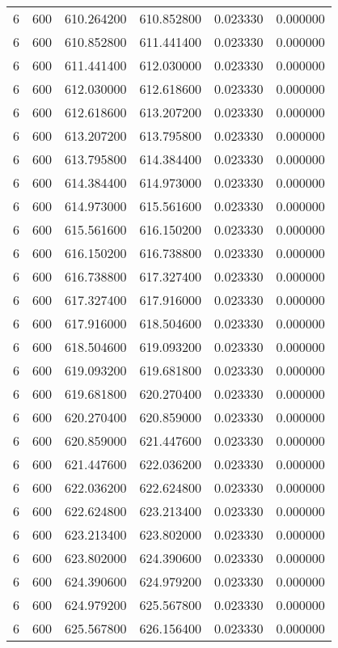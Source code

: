 \begin{longtable}{rrrrrr}
6 & 600 & 610.264200 & 610.852800 & 0.023330 & 0.000000 \\
6 & 600 & 610.852800 & 611.441400 & 0.023330 & 0.000000 \\
6 & 600 & 611.441400 & 612.030000 & 0.023330 & 0.000000 \\
6 & 600 & 612.030000 & 612.618600 & 0.023330 & 0.000000 \\
6 & 600 & 612.618600 & 613.207200 & 0.023330 & 0.000000 \\
6 & 600 & 613.207200 & 613.795800 & 0.023330 & 0.000000 \\
6 & 600 & 613.795800 & 614.384400 & 0.023330 & 0.000000 \\
6 & 600 & 614.384400 & 614.973000 & 0.023330 & 0.000000 \\
6 & 600 & 614.973000 & 615.561600 & 0.023330 & 0.000000 \\
6 & 600 & 615.561600 & 616.150200 & 0.023330 & 0.000000 \\
6 & 600 & 616.150200 & 616.738800 & 0.023330 & 0.000000 \\
6 & 600 & 616.738800 & 617.327400 & 0.023330 & 0.000000 \\
6 & 600 & 617.327400 & 617.916000 & 0.023330 & 0.000000 \\
6 & 600 & 617.916000 & 618.504600 & 0.023330 & 0.000000 \\
6 & 600 & 618.504600 & 619.093200 & 0.023330 & 0.000000 \\
6 & 600 & 619.093200 & 619.681800 & 0.023330 & 0.000000 \\
6 & 600 & 619.681800 & 620.270400 & 0.023330 & 0.000000 \\
6 & 600 & 620.270400 & 620.859000 & 0.023330 & 0.000000 \\
6 & 600 & 620.859000 & 621.447600 & 0.023330 & 0.000000 \\
6 & 600 & 621.447600 & 622.036200 & 0.023330 & 0.000000 \\
6 & 600 & 622.036200 & 622.624800 & 0.023330 & 0.000000 \\
6 & 600 & 622.624800 & 623.213400 & 0.023330 & 0.000000 \\
6 & 600 & 623.213400 & 623.802000 & 0.023330 & 0.000000 \\
6 & 600 & 623.802000 & 624.390600 & 0.023330 & 0.000000 \\
6 & 600 & 624.390600 & 624.979200 & 0.023330 & 0.000000 \\
6 & 600 & 624.979200 & 625.567800 & 0.023330 & 0.000000 \\
6 & 600 & 625.567800 & 626.156400 & 0.023330 & 0.000000 \\

\end{longtable}
